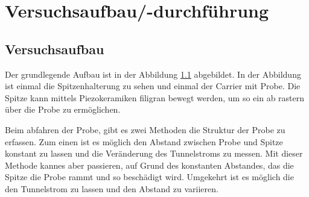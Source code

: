 \section{Versuchsaufbau/-durchführung}

\subsection{Versuchsaufbau}
Der grundlegende Aufbau ist in der Abbildung \ref{} abgebildet.
In der Abbildung ist einmal die Spitzenhalterung zu sehen und
einmal der Carrier mit Probe.
Die Spitze kann mittels Piezokeramiken filigran bewegt werden, um
so ein ab rastern über die Probe zu ermöglichen.

Beim abfahren der Probe, gibt es zwei Methoden die Struktur der Probe zu erfassen.
Zum einen ist es möglich den Abstand zwischen Probe und Spitze konstant zu lassen
und die Veränderung des Tunnelstroms zu messen. Mit dieser Methode kannes aber passieren,
auf Grund des konstanten Abstandes, das die Spitze die Probe rammt und so beschädigt wird.
Umgekehrt ist es möglich die den Tunnelstrom zu lassen und den Abstand zu variieren.
